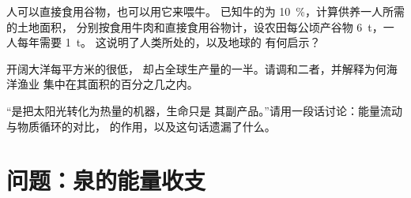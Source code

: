\begin{exercise}[$\star\star\star$]\label{exo:b1:ecosystem-organization:10}
人可以直接食用谷物，也可以用它来喂牛。
已知牛的为 \qty{10}{\%}，计算供养一人所需的土地面积，
分别按食用牛肉和直接食用谷物计，设农田每公顷产谷物
\qty{6}{t}，一人每年需要 \qty{1}{t}。
这说明了人类所处的，以及地球的
有何启示？
\end{exercise}

\begin{exercise}[$\star\star\star$]\label{exo:b1:ecosystem-organization:11}
开阔大洋每平方米的很低，
却占全球生产量的一半。请调和二者，并解释为何海洋渔业
集中在其面积的百分之几之内。
\end{exercise}

\begin{exercise}[$\star\star\star$]\label{exo:b1:ecosystem-organization:12}
“是把太阳光转化为热量的机器，生命只是
其副产品。”请用一段话讨论：能量流动与物质循环的对比，
的作用，以及这句话遗漏了什么。
\end{exercise}

\section{问题：泉的能量收支}

